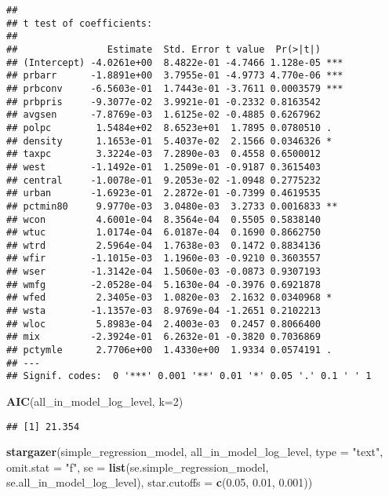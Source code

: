 \documentclass[
]{article}
\newenvironment{Shaded}{\begin{snugshade}}{\end{snugshade}}
\newcommand{\DataTypeTok}[1]{\textcolor[rgb]{0.13,0.29,0.53}{#1}}
\newcommand{\DecValTok}[1]{\textcolor[rgb]{0.00,0.00,0.81}{#1}}
\newcommand{\FloatTok}[1]{\textcolor[rgb]{0.00,0.00,0.81}{#1}}
\newcommand{\KeywordTok}[1]{\textcolor[rgb]{0.13,0.29,0.53}{\textbf{#1}}}
\newcommand{\NormalTok}[1]{#1}
\newcommand{\StringTok}[1]{\textcolor[rgb]{0.31,0.60,0.02}{#1}}
\begin{document}
\begin{verbatim}
## 
## t test of coefficients:
## 
##                Estimate  Std. Error t value  Pr(>|t|)    
## (Intercept) -4.0261e+00  8.4822e-01 -4.7466 1.128e-05 ***
## prbarr      -1.8891e+00  3.7955e-01 -4.9773 4.770e-06 ***
## prbconv     -6.5603e-01  1.7443e-01 -3.7611 0.0003579 ***
## prbpris     -9.3077e-02  3.9921e-01 -0.2332 0.8163542    
## avgsen      -7.8769e-03  1.6125e-02 -0.4885 0.6267962    
## polpc        1.5484e+02  8.6523e+01  1.7895 0.0780510 .  
## density      1.1653e-01  5.4037e-02  2.1566 0.0346326 *  
## taxpc        3.3224e-03  7.2890e-03  0.4558 0.6500012    
## west        -1.1492e-01  1.2509e-01 -0.9187 0.3615403    
## central     -1.0078e-01  9.2053e-02 -1.0948 0.2775232    
## urban       -1.6923e-01  2.2872e-01 -0.7399 0.4619535    
## pctmin80     9.9770e-03  3.0480e-03  3.2733 0.0016833 ** 
## wcon         4.6001e-04  8.3564e-04  0.5505 0.5838140    
## wtuc         1.0174e-04  6.0187e-04  0.1690 0.8662750    
## wtrd         2.5964e-04  1.7638e-03  0.1472 0.8834136    
## wfir        -1.1015e-03  1.1960e-03 -0.9210 0.3603557    
## wser        -1.3142e-04  1.5060e-03 -0.0873 0.9307193    
## wmfg        -2.0528e-04  5.1630e-04 -0.3976 0.6921878    
## wfed         2.3405e-03  1.0820e-03  2.1632 0.0340968 *  
## wsta        -1.1357e-03  8.9769e-04 -1.2651 0.2102213    
## wloc         5.8983e-04  2.4003e-03  0.2457 0.8066400    
## mix         -2.3924e-01  6.2632e-01 -0.3820 0.7036869    
## pctymle      2.7706e+00  1.4330e+00  1.9334 0.0574191 .  
## ---
## Signif. codes:  0 '***' 0.001 '**' 0.01 '*' 0.05 '.' 0.1 ' ' 1
\end{verbatim}

\begin{Shaded}
\begin{Highlighting}[]
\KeywordTok{AIC}\NormalTok{(all_in_model_log_level, }\DataTypeTok{k=}\DecValTok{2}\NormalTok{)}
\end{Highlighting}
\end{Shaded}

\begin{verbatim}
## [1] 21.354
\end{verbatim}

\begin{Shaded}
\begin{Highlighting}[]
\KeywordTok{stargazer}\NormalTok{(simple_regression_model, all_in_model_log_level, }
          \DataTypeTok{type =} \StringTok{"text"}\NormalTok{, }\DataTypeTok{omit.stat =} \StringTok{"f"}\NormalTok{,}
          \DataTypeTok{se =} \KeywordTok{list}\NormalTok{(se.simple_regression_model, se.all_in_model_log_level),}
          \DataTypeTok{star.cutoffs =} \KeywordTok{c}\NormalTok{(}\FloatTok{0.05}\NormalTok{, }\FloatTok{0.01}\NormalTok{, }\FloatTok{0.001}\NormalTok{))}
\end{Highlighting}
\end{Shaded}
\end{document}
